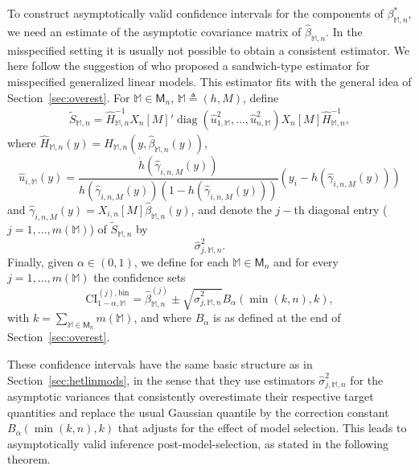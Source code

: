 \documentclass[preprint]{imsart}
\newcommand{\M}{\mathbb M}
\DeclareMathOperator{\diag}{diag}
\numberwithin{equation}{section}
\begin{document}
To construct asymptotically valid confidence intervals for the components of $\beta_{\M,n}^*$, we need an estimate of the asymptotic covariance matrix of $\hat{\beta}_{\M,n}$. In the misspecified setting it is usually not possible to obtain a consistent estimator. We here follow the suggestion of \citet[][p. 491]{Fahrmeir90} who proposed a sandwich-type estimator for misspecified generalized linear models. This estimator fits with the general idea of Section~\ref{sec:overest}. For $\M\in\mathsf{M}_n$, $\M \triangleq (h,M)$, define 
\begin{align}\label{eq:tildeSlogistic}
\tilde{S}_{\M,n} = \hat{H}_{\M,n}^{-1}X_n[M]'
	\diag\left(\hat{u}^2_{1,\mathbb{M}}, \hdots, \hat{u}^2_{n,\mathbb{M}} \right) 
	X_n[M] \hat{H}_{\M,n}^{-1},
\end{align} 
where $\hat{H}_{\M,n}(y) = H_{\M,n}(y,\hat{\beta}_{\M,n}(y))$,  
$$
\hat{u}_{i,\mathbb{M}}(y) = \frac{\dot{h}(\hat{\gamma}_{i,n,M}(y))}{h(\hat{\gamma}_{i,n,M}(y))(1-h(\hat{\gamma}_{i,n,M}(y)))}\left(y_i - h(\hat{\gamma}_{i,n,M}(y)) \right)
$$
and $\hat{\gamma}_{i,n,M}(y) = X_{i,n}[M]\hat{\beta}_{\M,n}(y)$, and denote the $j-$th diagonal entry ($j = 1, \hdots, m(\mathbb{M})$) of $\tilde{S}_{\M,n}$ by
\begin{equation}\label{eq:Sbinary}
\hat{\sigma}^2_{j,\mathbb{M}, n}.
\end{equation}
Finally, given $\alpha \in (0, 1)$, we define for each $\mathbb{M} \in \mathsf{M}_n$ and for every $j = 1, \hdots, m(\mathbb{M})$ the confidence sets
\begin{equation*}
\mathrm{CI}_{1-\alpha, \mathbb{M}}^{(j), \mathrm{bin}} = \hat{\beta}^{(j)}_{\mathbb{M}, n} \pm  \sqrt{\hat{\sigma}^2_{j,\mathbb{M}, n}} B_{\alpha}(\min(k, n),k),
\end{equation*}
with $k = \sum_{\M\in\mathsf{M}_n} m(\mathbb{M})$, and where $B_\alpha$ is as defined at the end of Section~\ref{sec:overest}.

These confidence intervals have the same basic structure as in Section~\ref{sec:hetlinmods}, in the sense that they use estimators $\hat{\sigma}_{j,\M,n}^2$ for the asymptotic variances that consistently overestimate their respective target quantities and replace the usual Gaussian quantile by the correction constant $B_{\alpha}(\min(k, n),k)$ that adjusts for the effect of model selection. This leads to asymptotically valid inference post-model-selection, as stated in the following theorem. 
\end{document}
